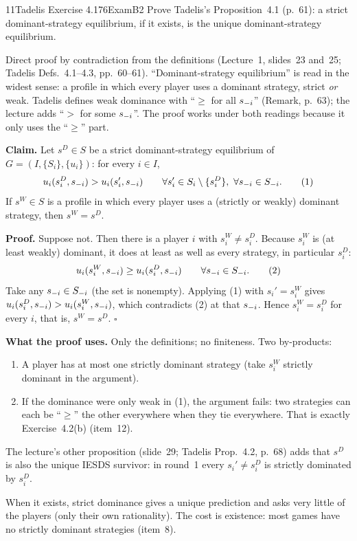 \begin{exsol}{11}{Tadelis Exercise 4.1}{76}{Exam}{B2}
\asked Prove Tadelis's Proposition~4.1 (p.~61): a strict dominant-strategy equilibrium, if it
exists, is the unique dominant-strategy equilibrium.

\method Direct proof by contradiction from the definitions (Lecture~1, slides~23 and~25;
Tadelis Defs.~4.1--4.3, pp.~60--61). ``Dominant-strategy equilibrium'' is read in the widest
sense: a profile in which every player uses a dominant strategy, strict \emph{or} weak.
Tadelis defines weak dominance with ``$\ge$ for all $s_{-i}$'' (Remark, p.~63); the lecture adds
``$>$ for some $s_{-i}$''. The proof works under both readings because it only uses the ``$\ge$''
part.

\solution
\textbf{Claim.} Let $s^D \in S$ be a strict dominant-strategy equilibrium of
$G = (I, \{S_i\}, \{u_i\})$: for every $i \in I$,
\[
  u_i(s_i^D, s_{-i}) > u_i(s_i', s_{-i}) \qquad \forall s_i' \in S_i \setminus \{s_i^D\},\ \forall s_{-i} \in S_{-i}. \tag{1}
\]
If $s^W \in S$ is a profile in which every player uses a (strictly or weakly) dominant strategy,
then $s^W = s^D$.

\textbf{Proof.} Suppose not. Then there is a player $i$ with $s_i^W \ne s_i^D$. Because $s_i^W$ is
(at least weakly) dominant, it does at least as well as every strategy, in particular $s_i^D$:
\[
  u_i(s_i^W, s_{-i}) \ge u_i(s_i^D, s_{-i}) \qquad \forall s_{-i} \in S_{-i}. \tag{2}
\]
Take any $s_{-i} \in S_{-i}$ (the set is nonempty). Applying (1) with $s_i' = s_i^W$ gives
$u_i(s_i^D, s_{-i}) > u_i(s_i^W, s_{-i})$, which contradicts (2) at that $s_{-i}$. Hence $s_i^W = s_i^D$
for every $i$, that is, $s^W = s^D$. \hfill$\square$

\textbf{What the proof uses.} Only the definitions; no finiteness. Two by-products:
\begin{enumerate}[label=(\roman*)]
  \item A player has at most one strictly dominant strategy (take $s^W_i$ strictly dominant
  in the argument).
  \item If the dominance were only weak in (1), the argument fails: two strategies can each be
  ``$\ge$'' the other everywhere when they tie everywhere. That is exactly Exercise~4.2(b)
  (item~12).
\end{enumerate}
The lecture's other proposition (slide~29; Tadelis Prop.~4.2, p.~68) adds that $s^D$ is also the
unique IESDS survivor: in round~1 every $s_i' \ne s_i^D$ is strictly dominated by $s_i^D$.

\interp When it exists, strict dominance gives a unique prediction and asks very little of the
players (only their own rationality). The cost is existence: most games have no strictly dominant
strategies (item~8).


\end{exsol}

